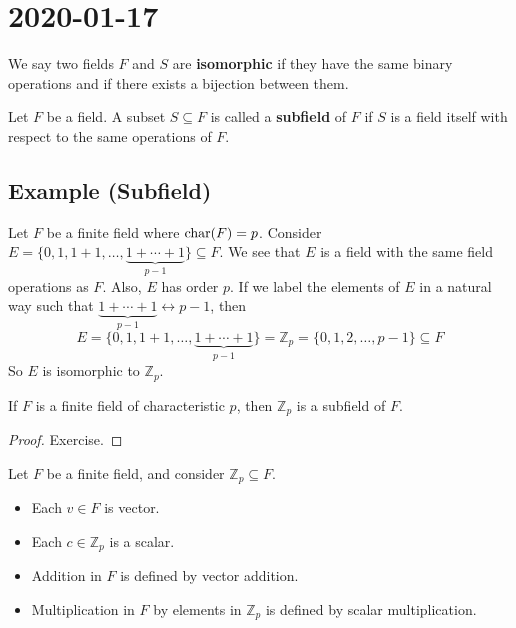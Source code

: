 \section{2020-01-17}

\begin{defbox}
    \begin{definition}
    We say two fields $F$ and $S$ are \textbf{isomorphic} if they have the same
    binary operations and if there exists a bijection between them.
\end{definition} \end{defbox}

\begin{defbox}
    \begin{definition}
    Let $ F $ be a field. A subset $ S\subseteq F $ is called a \textbf{subfield}
    of $ F $ if $ S $ is a field itself with respect to the same operations
    of $ F $.
\end{definition} \end{defbox}

\begin{exbox}
    \subsection{Example (Subfield)}
    Let $ F $ be a finite field where $ \operatorname{char}(F)=p $. Consider
    $ E=\{0,1,1+1,\ldots,\underbrace{1+\cdots+1}_{p-1}\}\subseteq F $.
    We see that $ E $ is a field with the same field operations as $ F $.
    Also, $ E $ has order $ p $. If we label the elements of $ E $
    in a natural way such that $ \underbrace{1+\cdots+1}_{p-1}
    \longleftrightarrow p-1 $,
    then
    \[ E=\{0,1,1+1,\ldots,\underbrace{1+\cdots+1}_{p-1}\}
    = \mathbb{Z}_p= \{0,1,2,\ldots ,p-1\}\subseteq F \]
    So $ E $ is isomorphic to $ \mathbb{Z}_p $.
\end{exbox}

\begin{thmbox}
    \begin{theorem}
    If $ F $ is a finite field of characteristic $ p $, then
    $ \mathbb{Z}_p $ is a subfield of $ F $.
\end{theorem} \end{thmbox}

\begin{proof}
    Exercise.
\end{proof}

\begin{defbox}
    \begin{definition}
    Let $ F $ be a finite field, and consider $ \mathbb{Z}_p\subseteq F $.
    \begin{itemize}
        \item Each $ v\in F $ is vector.
        \item Each $ c\in\mathbb{Z}_p $ is a scalar.
        \item Addition in $ F $ is defined by vector addition.
        \item Multiplication in $ F $ by elements in $ \mathbb{Z}_p $
        is defined by scalar multiplication.
    \end{itemize}
\end{definition} \end{defbox}

